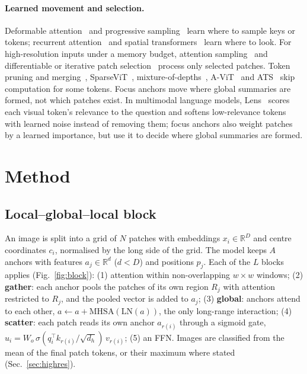 \documentclass[10pt]{article}
\begin{document}
\paragraph{Learned movement and selection.}
Deformable attention~\citep{xia2022dat} and progressive sampling~\citep{yue2021psvit} learn where
to sample keys or tokens; recurrent attention~\citep{mnih2014ram} and spatial
transformers~\citep{jaderberg2015stn} learn where to look. For high-resolution inputs under a
memory budget, attention sampling~\citep{katharopoulos2019attsampling} and differentiable or
iterative patch selection~\citep{cordonnier2021dps,bergner2023ips} process only selected patches.
Token pruning and merging~\citep{rao2021dynamicvit,bolya2023tome}, SparseViT~\citep{chen2023sparsevit},
mixture-of-depths~\citep{raposo2024mod}, A-ViT~\citep{yin2022avit} and ATS~\citep{fayyaz2022ats}
skip computation for some tokens. Focus anchors move where global summaries are formed, not
which patches exist. In multimodal language models, Lens~\citep{jiang2026lens} scores each visual
token's relevance to the question and softens low-relevance tokens with learned noise instead of
removing them; focus anchors also weight patches by a learned importance, but use it to decide
where global summaries are formed.

\section{Method}
\label{sec:method}

\subsection{Local--global--local block}

An image is split into a grid of $N$ patches with embeddings $x_i\in\mathbb{R}^{D}$ and centre
coordinates $c_i$, normalised by the long side of the grid. The model keeps $A$ anchors with
features $a_j\in\mathbb{R}^{d}$ ($d<D$) and positions $p_j$. Each of the $L$ blocks applies
(Fig.~\ref{fig:block}): (1) attention within non-overlapping $w\times w$ windows; (2)
\textbf{gather}: each anchor pools the patches of its own region $R_j$ with attention restricted
to $R_j$, and the pooled vector is added to $a_j$; (3) \textbf{global}: anchors attend to each
other, $a\leftarrow a+\mathrm{MHSA}(\mathrm{LN}(a))$, the only long-range interaction; (4)
\textbf{scatter}: each patch reads its own anchor $a_{r(i)}$ through a sigmoid gate,
$u_i=W_o\,\sigma(q_i^{\top}k_{r(i)}/\sqrt{d_h})\,v_{r(i)}$; (5) an FFN. Images are classified from
the mean of the final patch tokens, or their maximum where stated (Sec.~\ref{sec:highres}).
\end{document}
